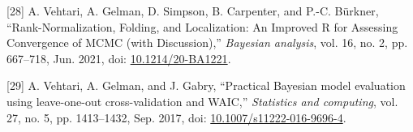 \documentclass[11pt]{article}
\begin{document}
\hypertarget{citeproc_bib_item_28}{[28] A. Vehtari, A. Gelman, D. Simpson, B. Carpenter, and P.-C. Bürkner, “Rank-Normalization, Folding, and Localization: An Improved R for Assessing Convergence of MCMC (with Discussion),” \textit{Bayesian analysis}, vol. 16, no. 2, pp. 667–718, Jun. 2021, doi: \href{https://doi.org/10.1214/20-BA1221}{10.1214/20-BA1221}.}

\hypertarget{citeproc_bib_item_29}{[29] A. Vehtari, A. Gelman, and J. Gabry, “Practical Bayesian model evaluation using leave-one-out cross-validation and WAIC,” \textit{Statistics and computing}, vol. 27, no. 5, pp. 1413–1432, Sep. 2017, doi: \href{https://doi.org/10.1007/s11222-016-9696-4}{10.1007/s11222-016-9696-4}.}
\end{document}
